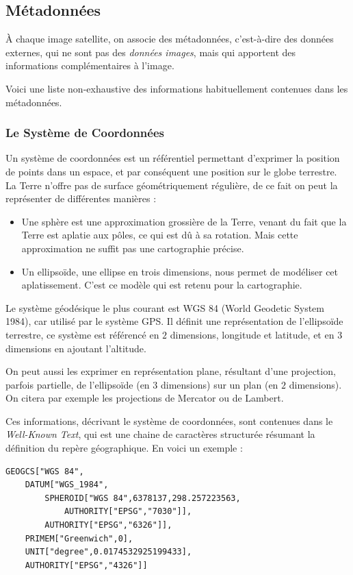 \documentclass[a4paper, 10pt]{report}
\begin{document}
\subsection{Métadonnées}
À chaque image satellite, on associe des métadonnées, c'est-à-dire des données externes, qui ne sont pas des \emph{données images}, mais qui apportent des informations complémentaires à l'image.

Voici une liste non-exhaustive des informations habituellement contenues dans les métadonnées.
\subsubsection{Le Système de Coordonnées}
Un système de coordonnées est un référentiel permettant d'exprimer la position de points dans un espace, et par conséquent une position sur le globe terrestre.
La Terre n'offre pas de surface géométriquement régulière, de ce fait on peut la représenter de différentes manières :
\begin{itemize}
	\item Une sphère est une approximation grossière de la Terre, venant du fait que la Terre est aplatie aux pôles, ce qui est dû à sa rotation. Mais cette approximation ne suffit pas une cartographie précise.
	\item Un ellipsoïde, une ellipse en trois dimensions, nous permet de modéliser cet aplatissement. C'est ce modèle qui est retenu pour la cartographie.
\end{itemize}

Le système géodésique le plus courant est WGS 84 (World Geodetic System 1984), car utilisé par le système GPS. Il définit une représentation de l'ellipsoïde terrestre, ce système est référencé en $2$ dimensions, longitude et latitude, et en $3$ dimensions en ajoutant l'altitude.

On peut aussi les exprimer en représentation plane, résultant d'une projection, parfois partielle, de l'ellipsoïde (en $3$ dimensions) sur un plan (en $2$ dimensions). On citera par exemple les projections de Mercator ou de Lambert.

Ces informations, décrivant le système de coordonnées, sont contenues dans le \emph{Well-Known Text}, qui est une chaine de caractères structurée résumant la définition du repère géographique. En voici un exemple :

\begin{verbatim}
GEOGCS["WGS 84",
    DATUM["WGS_1984",
        SPHEROID["WGS 84",6378137,298.257223563,
            AUTHORITY["EPSG","7030"]],
        AUTHORITY["EPSG","6326"]],
    PRIMEM["Greenwich",0],
    UNIT["degree",0.0174532925199433],
    AUTHORITY["EPSG","4326"]]
\end{verbatim}
\end{document}

